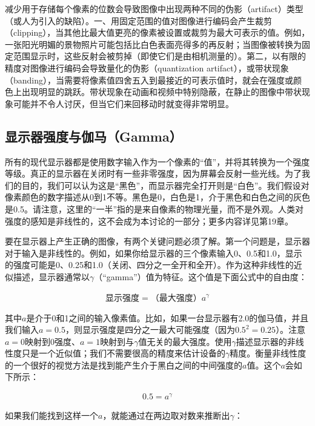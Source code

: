 \documentclass[lang=cn,12pt]{elegantbook}
\begin{document}
减少用于存储每个像素的位数会导致图像中出现两种不同的伪影（artifact）类型（或人为引入的缺陷）。一、用固定范围的值对图像进行编码会产生裁剪（clipping），当其他比最大值更亮的像素被设置或裁剪为最大可表示的值。例如，一张阳光明媚的景物照片可能包括比白色表面亮得多的再反射；当图像被转换为固定范围显示时，这些反射会被剪掉（即使它们是由相机测量的）。第二，以有限的精度对图像进行编码会导致量化的伪影（quantization artifact），或带状现象（banding），当需要将像素值四舍五入到最接近的可表示值时，就会在强度或颜色上出现明显的跳跃。带状现象在动画和视频中特别隐蔽，在静止的图像中带状现象可能并不令人讨厌，但当它们来回移动时就变得非常明显。

\subsection{显示器强度与伽马（Gamma）}

所有的现代显示器都是使用数字输入作为一个像素的“值”，并将其转换为一个强度等级。真正的显示器在关闭时有一些非零强度，因为屏幕会反射一些光线。为了我们的目的，我们可以认为这是“黑色”，而显示器完全打开则是“白色”。我们假设对像素颜色的数字描述从0到1不等。黑色是0，白色是1，介于黑色和白色之间的灰色是0.5。请注意，这里的“一半”指的是来自像素的物理光量，而不是外观。人类对强度的感知是非线性的，这不会成为本讨论的一部分；更多内容详见第19章。

要在显示器上产生正确的图像，有两个关键问题必须了解。第一个问题是，显示器对于输入是非线性的。例如，如果你给显示器的三个像素输入0、0.5和1.0，显示的强度可能是0、0.25和1.0（关闭、四分之一全开和全开）。作为这种非线性的近似描述，显示器通常以$\gamma $（“gamma”）值为特征。这个值是下面公式中的自由度：

\begin{align}
  \mbox{显示强度}=\mbox{（最大强度）}a^\gamma
\end{align}

其中$a$是介于0和1之间的输入像素值。比如，如果一台显示器有2.0的伽马值，并且我们输入$a=0.5$，则显示强度是四分之一最大可能强度（因为$0.5^2=0.25$）。注意$a=0$映射到0强度、$a=1$映射到与$\gamma$值无关的最大强度。使用$\gamma$描述显示器的非线性度只是一个近似值；我们不需要很高的精度来估计设备的$\gamma$精度。衡量非线性度的一个很好的视觉方法是找到能产生介于黑白之间的中间强度的$a$值。这个$a$会如下所示：

\[
  \begin{aligned}
  0.5 = a^\gamma 
  \end{aligned}
\]

如果我们能找到这样一个$a$，就能通过在两边取对数来推断出$\gamma$：
\end{document}
